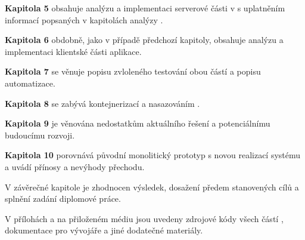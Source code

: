 \textbf{Kapitola 5} obsahuje analýzu a implementaci serverové části  v  s uplatněním informací popsaných v kapitolách analýzy .

\textbf{Kapitola 6} obdobně, jako v případě předchozí kapitoly, obsahuje analýzu a implementaci klientské části aplikace.

\textbf{Kapitola 7} se věnuje popisu zvloleného testování obou částí  a popisu automatizace.

\textbf{Kapitola 8} se zabývá kontejnerizací a nasazováním .

\textbf{Kapitola 9} je věnována nedostatkům aktuálního řešení a potenciálnímu budoucímu rozvoji.

\textbf{Kapitola 10} porovnává původní monolitický prototyp s novou realizací systému a uvádí přínosy a nevýhody přechodu.

V závěrečné kapitole je zhodnocen výsledek, dosažení předem stanovených cílů a splnění zadání diplomové práce.

V přílohách a na přiloženém médiu jsou uvedeny zdrojové kódy všech částí , dokumentace pro vývojáře a jiné dodatečné materiály.
